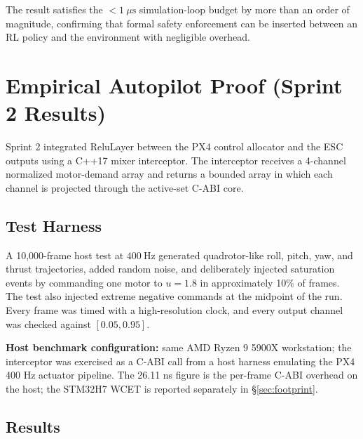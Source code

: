 \documentclass[11pt]{article}
\begin{document}
The result satisfies the $<1\ \mu\text{s}$ simulation-loop budget by more than an order of magnitude, confirming that formal safety enforcement can be inserted between an RL policy and the environment with negligible overhead.

\section{Empirical Autopilot Proof (Sprint 2 Results)}
\label{sec:sprint2}

Sprint 2 integrated ReluLayer between the PX4 control allocator and the ESC outputs using a C++17 mixer interceptor. The interceptor receives a 4-channel normalized motor-demand array and returns a bounded array in which each channel is projected through the active-set C-ABI core.

\subsection{Test Harness}

A 10,000-frame host test at $400\ \text{Hz}$ generated quadrotor-like roll, pitch, yaw, and thrust trajectories, added random noise, and deliberately injected saturation events by commanding one motor to $u = 1.8$ in approximately 10\% of frames. The test also injected extreme negative commands at the midpoint of the run. Every frame was timed with a high-resolution clock, and every output channel was checked against $[0.05, 0.95]$.

\textbf{Host benchmark configuration:} same AMD Ryzen 9 5900X workstation; the interceptor was exercised as a C-ABI call from a host harness emulating the PX4 400 Hz actuator pipeline. The 26.11 ns figure is the per-frame C-ABI overhead on the host; the STM32H7 WCET is reported separately in \S\ref{sec:footprint}.

\subsection{Results}
\end{document}
